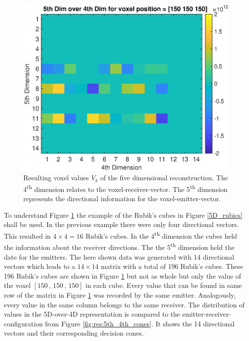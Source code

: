  
\begin{figure}[H]
    \centering
    \includegraphics[width=0.89\linewidth]{Graphics/Results/4d_5d/5thDim_over_4thDim_150_150_150.eps}
    \caption{Resulting voxel values $V_k$ of the five dimensional reconstruction. The 4\textsuperscript{th} dimension relates to the voxel-receiver-vector. The 5\textsuperscript{th} dimension represents the directional information for the voxel-emitter-vector.}
    \label{fig:res:5th_dim_over_4th_result}
\end{figure}

To understand Figure \ref{fig:res:5th_dim_over_4th_result} the example of the Rubik's cubes in Figure \ref{5D_rubics} shall be used. In the previous example there were only four directional vectors. This resulted in $4 \times 4 = 16$ Rubik's cubes. In the 4\textsuperscript{th} dimension the cubes held the information about the receiver directions. The the 5\textsuperscript{th} dimension held the date for the emitters. The here shown data was generated with 14 directional vectors which leads to a $14 \times 14$ matrix with a total of 196 Rubik's cubes. These 196 Rubik's cubes are shown in Figure \ref{fig:res:5th_dim_over_4th_result} but not as whole but only the value of the voxel $[150\, , \, 150\, , \, 150]$ in each cube.
Every value that can be found in same row of the matrix in Figure \ref{fig:res:5th_dim_over_4th_result} was recorded by the same emitter. Analogously, every value in the same column belongs to the same receiver. The distribution of values in the 5D-over-4D representation is compared to the emitter-receiver-configuration from Figure \ref{fig:res:5th_4th_cones}. It shows the 14 directional vectors and their corresponding decision cones.


